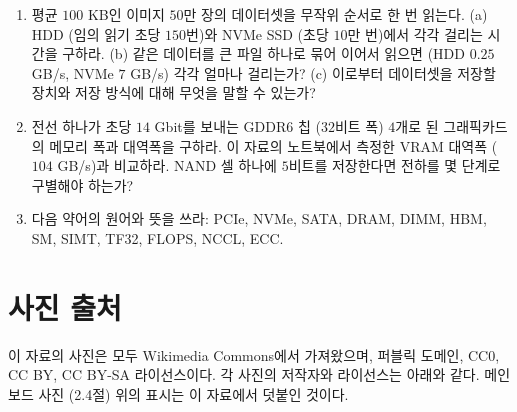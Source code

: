 \documentclass[11pt,a4paper]{article}
\begin{document}
\begin{enumerate}[label=\arabic*.]
\item 평균 $100$ KB인 이미지 $50$만 장의 데이터셋을 무작위 순서로 한 번 읽는다.
(a) HDD (임의 읽기 초당 $150$번)와 NVMe SSD (초당 $10$만 번)에서 각각 걸리는 시간을 구하라.
(b) 같은 데이터를 큰 파일 하나로 묶어 이어서 읽으면 (HDD $0.25$ GB/s, NVMe $7$ GB/s) 각각 얼마나 걸리는가?
(c) 이로부터 데이터셋을 저장할 장치와 저장 방식에 대해 무엇을 말할 수 있는가?

\item 전선 하나가 초당 $14$ Gbit를 보내는 GDDR6 칩 ($32$비트 폭) $4$개로 된 그래픽카드의 메모리 폭과 대역폭을 구하라.
이 자료의 노트북에서 측정한 VRAM 대역폭 ($104$ GB/s)과 비교하라.
NAND 셀 하나에 $5$비트를 저장한다면 전하를 몇 단계로 구별해야 하는가?

\item 다음 약어의 원어와 뜻을 쓰라: PCIe, NVMe, SATA, DRAM, DIMM, HBM, SM, SIMT, TF32, FLOPS, NCCL, ECC.

\end{enumerate}

\section*{사진 출처}

이 자료의 사진은 모두 Wikimedia Commons에서 가져왔으며, 퍼블릭 도메인, CC0, CC BY, CC BY-SA 라이선스이다.
각 사진의 저작자와 라이선스는 아래와 같다. 메인보드 사진 (2.4절) 위의 표시는 이 자료에서 덧붙인 것이다.


\end{document}
